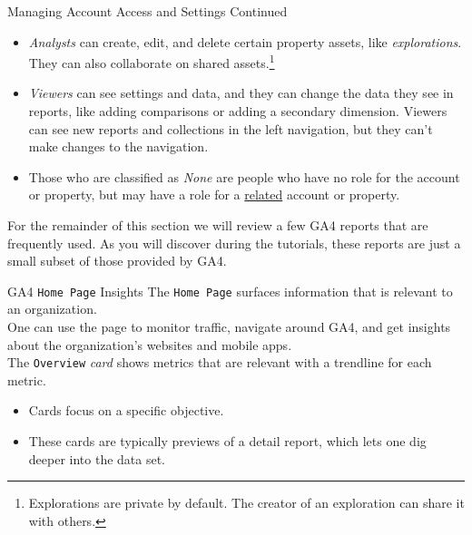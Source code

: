 \documentclass[pdf]{beamer}
\theoremstyle{remark}
\theoremstyle{definition}
\begin{document}
\begin{frame}[t]{Managing Account Access and Settings Continued}
\small
\begin{itemize}
  \item \textit{Analysts} can create, edit, and delete certain property assets, like \textit{explorations}. They can also collaborate on shared assets.\footnote{Explorations are private by default. The creator of an exploration can share it with others.} 
  \item  \textit{Viewers} can see settings and data, and they can change the data they see in reports, like adding comparisons or adding a secondary dimension. Viewers can see new reports and collections in the left navigation, but they can't make changes to the navigation.
  \item Those who are classified as \textit{None} are people who have no role for the account or property, but may have a role for a \underline{related} account or property.
\end{itemize}
For the remainder of this section we will review a few GA4 reports that are frequently used.  As you will discover during the tutorials, these reports are just a small subset of those provided by GA4.
\end{frame}

\begin{frame}[t]{GA4 \texttt{Home Page} Insights}
The \texttt{Home Page} surfaces information that is relevant to an organization. \\
\vspace{1.5ex}
One can use the page to monitor traffic, navigate around GA4, and get insights about the organization's websites and mobile apps. \\
\vspace{1.5ex}
The \texttt{Overview} \textit{card} shows metrics that are relevant with a trendline for each metric. \\
\small
\begin{itemize}
\item Cards focus on a specific objective. 
\item These cards are typically previews of a detail report, which lets one dig deeper into the data set. 
\end{itemize} 
\end{frame}
\end{document}
